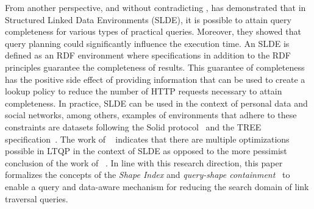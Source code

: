 From another perspective, and without contradicting \citeauthor{hartig2016walking}, \citeauthor{Taelman2023} has demonstrated that in Structured Linked Data Environments (SLDE),
it is possible to attain query completeness for various types of practical queries.
Moreover, they showed that query planning could significantly influence the execution time.
An SLDE is defined as an RDF environment where specifications in addition to the RDF principles guarantee the completeness of results.
This guarantee of completeness has the positive side effect of providing information
that can be used to create a lookup policy to reduce the number of HTTP requests necessary to attain completeness.
In practice, SLDE can be used in the context of personal data and social networks, among others,
examples of environments that adhere to these constraints are datasets following the Solid protocol~\cite{Taelman2023} and the TREE specification~\cite{tam_iswc_traversalsensortree_2024}.
The work of ~\citeauthor{Taelman2023} indicates that there are multiple optimizations possible in LTQP in the context of SLDE as opposed to the
more pessimist conclusion of the work of ~\citeauthor{hartig2016walking}.
In line with this research direction, this paper formalizes the concepts of the \emph{Shape Index} and \emph{query-shape containment}~\cite{tam2024opportunitiesshapebasedoptimizationlink} to enable a query and data-aware mechanism for reducing the search domain of link traversal queries.
\iffalse
The shape index concept relies on RDF data shapes; the conceptual idea of RDF data shapes is to describe the properties of an entity.
We propose to use them in an index to describe decentralized datasets.
Because shapes and queries share similarities, we propose transforming shapes into queries to perform a query containment problem
and assist our source selection.
\fi

